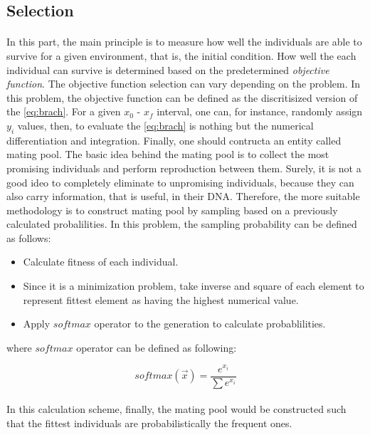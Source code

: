 \documentclass[letterpaper,12pt]{article}
\begin{document}
\subsection{Selection}
\paragraph{} In this part, the main principle is to measure how well the individuals are able to survive for a given environment, that is, the initial condition. How well the each individual can survive is determined based on the predetermined \textit{objective function}. The objective function selection can vary depending on the problem. In this problem, the objective function can be defined as the discritisized version of the \eqref{eq:brach}. For a given $x_0$ - $x_f$ interval, one can, for instance, randomly assign $y_i$ values, then, to evaluate the \eqref{eq:brach} is nothing but the numerical differentiation and integration. Finally, one should contructa an entity called mating pool. The basic idea behind the mating pool is to collect the most promising individuals and perform reproduction between them. Surely, it is not a good ideo to completely eliminate to unpromising individuals, because they can also carry information, that is useful, in their DNA. Therefore, the more suitable methodology is to construct mating pool by sampling based on a previously calculated probalilities. In this problem, the sampling probability can be defined as follows:
\begin{itemize}
    \item Calculate fitness of each individual.
    \item Since it is a minimization problem, take inverse and square of each element to represent fittest element as having the highest numerical value.
    \item Apply $softmax$ operator to the generation to calculate probablilities.
\end{itemize}
where $softmax$ operator can be defined as following:

\begin{equation*}
    softmax(\vec{x}) = \frac{e^{x_i}}{\sum e^{x_i}}
\end{equation*}

\paragraph{} In this calculation scheme, finally, the mating pool would be constructed such that the fittest individuals are probabilistically the frequent ones.
\end{document}
